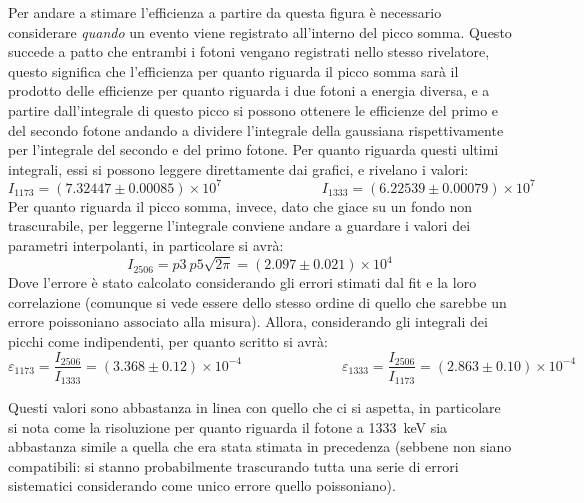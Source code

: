 Per andare a stimare l'efficienza a partire da questa figura è necessario considerare \textit{quando} un evento viene registrato all'interno del picco somma. Questo succede
a patto che entrambi i fotoni vengano registrati nello stesso rivelatore, questo significa che l'efficienza per quanto riguarda il picco somma sarà il prodotto delle efficienze
per quanto riguarda i due fotoni a energia diversa, e a partire dall'integrale di questo picco si possono ottenere le efficienze del primo e del secondo fotone andando a
dividere l'integrale della gaussiana rispettivamente per l'integrale del secondo e del primo fotone. Per quanto riguarda questi ultimi integrali, essi si possono leggere
direttamente dai grafici, e rivelano i valori:
$$I_{1173} = (7.32447 \pm 0.00085)\times 10^7 \hspace{3cm} I_{1333} = (6.22539 \pm 0.00079)\times 10^7$$
Per quanto riguarda il picco somma, invece, dato che giace su un fondo non trascurabile, per leggerne l'integrale conviene andare a guardare i valori dei parametri
interpolanti, in particolare si avrà:
$$I_{2506}= p3\ p5\sqrt{2\pi} = (2.097 \pm 0.021)\times 10^4$$
Dove l'errore è stato calcolato considerando gli errori stimati dal fit e la loro correlazione (comunque si vede essere dello stesso ordine di quello che sarebbe un errore
poissoniano associato alla misura). Allora, considerando gli integrali dei picchi come indipendenti, per quanto
scritto si avrà:
$$\varepsilon_{1173}=\frac{I_{2506}}{I_{1333}}=(3.368 \pm 0.12)\times 10^{-4} \hspace{3cm} \varepsilon_{1333}=\frac{I_{2506}}{I_{1173}}=(2.863 \pm 0.10)\times 10^{-4}$$

Questi valori sono abbastanza in linea con quello che ci si aspetta, in particolare si nota come la risoluzione per quanto riguarda il fotone a 1333~keV sia abbastanza
simile a quella che era stata stimata in precedenza (sebbene non siano compatibili: si stanno probabilmente trascurando tutta una serie di errori sistematici considerando
come unico errore quello poissoniano).